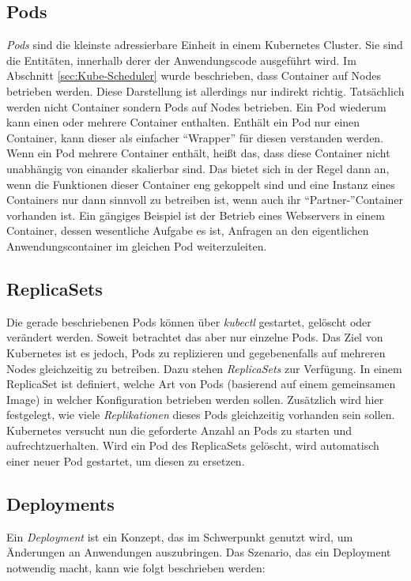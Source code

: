 \documentclass[11pt,a4paper]{article}
\begin{document}
\subsection{Pods}
\emph{Pods} sind die kleinste adressierbare Einheit in einem Kubernetes Cluster. 
Sie sind die Entitäten, innerhalb derer der Anwendungscode ausgeführt wird.
Im Abschnitt \ref{sec:Kube-Scheduler} wurde beschrieben, dass Container auf Nodes betrieben werden.
Diese Darstellung ist allerdings nur indirekt richtig. Tatsächlich werden nicht Container sondern Pods auf Nodes betrieben.
Ein Pod wiederum kann einen oder mehrere Container enthalten. Enthält ein Pod nur einen Container,
kann dieser als einfacher ``Wrapper'' für diesen verstanden werden. 
Wenn ein Pod mehrere Container enthält, heißt das, dass diese Container nicht unabhängig von einander skalierbar sind.
Das bietet sich in der Regel dann an, wenn die Funktionen dieser Container eng gekoppelt sind und eine Instanz eines
Containers nur dann sinnvoll zu betreiben ist, wenn auch ihr ``Partner-''Container vorhanden ist.
Ein gängiges Beispiel ist der Betrieb eines Webservers in einem Container, dessen wesentliche Aufgabe es ist,
Anfragen an den eigentlichen Anwendungscontainer im gleichen Pod weiterzuleiten. 
\subsection{ReplicaSets}
Die gerade beschriebenen Pods können über \emph{kubectl} gestartet, gelöscht oder verändert werden.
Soweit betrachtet das aber nur einzelne Pods. Das Ziel von Kubernetes ist es jedoch, 
Pods zu replizieren und gegebenenfalls auf mehreren Nodes gleichzeitig zu betreiben.
Dazu stehen \emph{ReplicaSets} zur Verfügung. 
In einem ReplicaSet ist definiert, welche Art von Pods (basierend auf einem gemeinsamen Image)
in welcher Konfiguration betrieben werden sollen. Zusätzlich wird hier festgelegt, wie viele \emph{Replikationen}
dieses Pods gleichzeitig vorhanden sein sollen.
Kubernetes versucht nun die geforderte Anzahl an Pods zu starten und aufrechtzuerhalten. 
Wird ein Pod des ReplicaSets gelöscht, wird automatisch einer neuer Pod gestartet, um diesen zu ersetzen.
\subsection{Deployments}
Ein \emph{Deployment} ist ein Konzept, das im Schwerpunkt genutzt wird, um Änderungen an Anwendungen auszubringen.
Das Szenario, das ein Deployment notwendig macht, kann wie folgt beschrieben werden:
\end{document}
